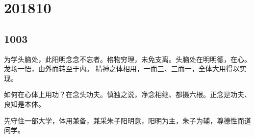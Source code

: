 \section{201810}

\subsection{1003}

为学头脑处，此阳明念念不忘者。格物穷理，未免支离。头脑处在明明德，在心。龙场一悟，由外而转至于内。
精神之体相用，一而三、三而一，全体大用得以实现。

如何在心体上用功？在念头功夫。慎独之说，净念相继、都摄六根。正念是功夫、良知是本体。

先守住一部大学，体用兼备，兼采朱子阳明意，阳明为主，朱子为辅，尊德性而道问学。
